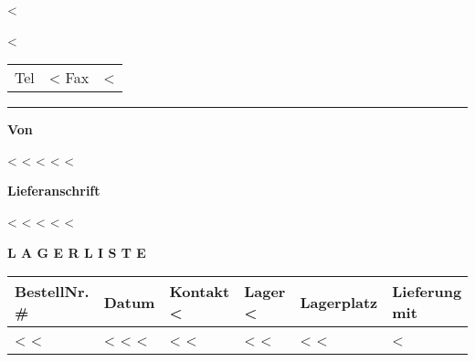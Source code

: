\documentclass[twoside]{scrartcl}
\begin{document}
\pagestyle{myheadings}
\thispagestyle{empty}

\fontsize{10pt}{12pt}\selectfont

\vspace*{-1.3cm}

\parbox{\textwidth}{
  \parbox[b]{.42\textwidth}{%
    <%

    <%
  }\hfill
  \begin{tabular}[b]{rr@{}}
  Tel & <%
  Fax & <%
  \end{tabular}

  \rule[1.5ex]{\textwidth}{0.5pt}
}

\vspace*{0.5cm}

\parbox[t]{1cm}{\hfill}
\parbox[t]{.5\textwidth}{
\textbf{Von}
\vspace{0.7cm}

<%
<%
<%
<%
<%
}
\parbox[t]{.4\textwidth}{
\textbf{Lieferanschrift}
\vspace{0.7cm}

<%
<%
<%
<%
<%
}
\hfill

\vspace{1cm}

\textbf{L A G E R L I S T E}
\hfill

\vspace{1cm}

\begin{tabularx}{\textwidth}{*{6}{|X}|} \hline
  \textbf{BestellNr. \#} & \textbf{Datum} & \textbf{Kontakt}
  <%
  & \textbf{Lager}
  <%
  & \textbf{Lagerplatz} & \textbf{Lieferung mit} \\ [0.5em]
  \hline

  <%
  <%
  & <%
  <%
  <%
  & <%
  <%
  & <%
  <%
  & <%
  <%
  & <%
  \hline
\end{tabularx}
\end{document}
